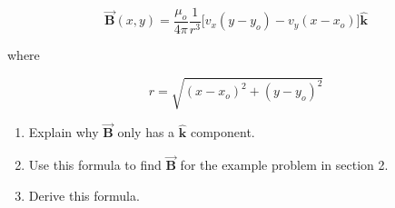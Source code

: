 \documentclass{article}
\newcommand{\khat}[0]{\hat{\boldsymbol{k}}}
\newcommand{\bfvec}[1]{\vec{\mathbf{#1}}}
\begin{document}
$$\bfvec{B}(x,y)= \frac{\mu_o}{4\pi} \frac{1}{r^3} \big[v_x(y-y_o) - v_y(x-x_o)\big]\khat$$

where

$$r=\sqrt{(x-x_o)^2+(y-y_o)^2}$$

\begin{enumerate}

  \item Explain why $\bfvec{B}$ only has a $\khat$ component.

  \item Use this formula to find $\bfvec{B}$ for the example problem in section 2.

  \item Derive this formula.

\end{enumerate}
\end{document}
